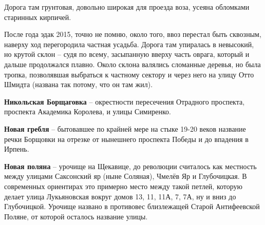 Дорога там грунтовая, довольно широкая для проезда воза, усеяна обломками старинных кирпичей.

После года эдак 2015, точно не помню, около того, ввоз перестал быть сквозным, наверху ход перегородила частная усадьба. Дорога там упиралась в невысокий, но крутой склон – судя по всему, засыпанную вверху часть оврага, который и дальше продолжался плавно. Около склона валялись сломанные деревья, но была тропка, позволявшая выбраться к частному сектору и через него на улицу Отто Шмидта (названа так потому, что он там жил).\\

\medskip

\textbf{Никольская Борщаговка} – окрестности пересечения Отрадного проспекта, проспекта Академика Королева, и улицы Симиренко.\\

\medskip

\textbf{Новая гребля} – бытовавшее по крайней мере на стыке 19-20 веков название речки Борщовки на отрезке от нынешнего проспекта Победы и до впадения в Ирпень.\\

\newpage

\textbf{Новая поляна} – урочище на Щекавице, до революции считалось как местность между улицами Саксонский яр (ныне Соляная), Чмелёв Яр и Глубочицкая. В современных ориентирах это примерно место между такой петлей, которую делает улица Лукьяновская вокруг домов 13, 11, 11А, 7, 7А, ну и вниз до Глубочицкой. Урочище названо в противовес близлежащей Старой Антифеевской Поляне, от которой осталось название улицы.\\


